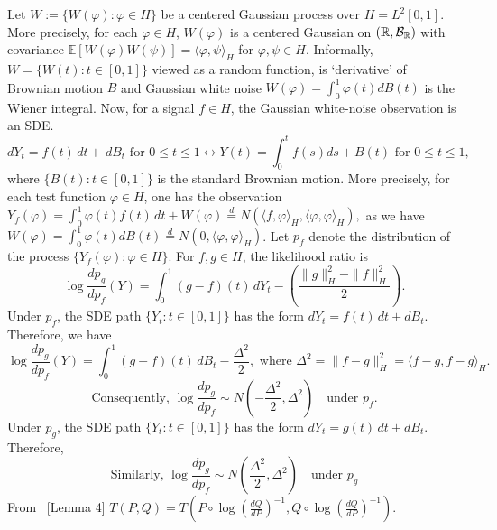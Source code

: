 Let \(W:= \{W(\varphi):\varphi \in H\} \) be a centered Gaussian process over \(H= L^2[0,1]\). More precisely,  for each \(\varphi\in H\), \(W(\varphi)\) is a centered Gaussian on $(\mathbb{R}, \mathcal{B}_{\mathbb{R}})$  with  covariance $\mathbb E[W(\varphi)W(\psi)] =
    \langle \varphi,\psi\rangle_{H}$ for $\varphi,\psi\in H.$ Informally, $W= \{W(t): t\in [0,1]\}$ viewed as a random function, is `derivative' of Brownian motion $B$ and Gaussian white noise $W(\varphi)=\int_{0}^1 \varphi(t)dB(t)$ \cite{gine2016mathematical} is the Wiener integral. Now, for a signal \(f\in H\), the Gaussian white-noise observation is an SDE.
\begin{equation} \label{eq:AGWN}
dY_t=f(t)\,dt+\,dB_t \text{ for } 0\le t\le 1 \leftrightarrow Y(t)= \int_{0}^t f(s)ds + B(t) \text{ for } 0\le t\le 1, 
\end{equation}
 where $\{B(t): t\in [0,1]\}$ is the standard Brownian motion.
More precisely, for each test function \(\varphi\in H\), one has the observation  $Y_f(\varphi) =\int_0^1 \varphi(t)f(t)\,dt + W(\varphi) \overset{d}{=} N(\langle f, \varphi \rangle_{H}, \langle \varphi, \varphi\rangle_H ),$ as we have $W(\varphi)= \int_{0}^1 \varphi(t) dB(t)\overset{d}{=} N(0, \langle \varphi, \varphi \rangle_H)$.
Let \(p_f\) denote the distribution of the process  $\{Y_f(\varphi):\varphi\in H\}.$
For \(f,g\in H\), the likelihood ratio is   
\begin{equation}
    \log\frac{dp_g}{dp_f}(Y)
    =
    \int_0^1 (g-f)(t)\,dY_t
    -
    \left(
        \frac{\|g\|_{H}^2-\|f\|_{H}^2}{2}
    \right).
\end{equation}
Under \(p_f\), the SDE path $\{Y_t:t \in [0,1]\}$ has the form  $dY_t=f(t)\,dt+ dB_t.$ Therefore, we have
\[
\log\frac{dp_g}{dp_f}(Y)
    =
    \int_0^1 (g-f)(t)\,dB_t
    -
    \frac{\Delta^2}{2}, \text{ where } \Delta^2= \|f-g\|_{H}^2 =\langle f-g, f-g\rangle_H .
\]
\begin{equation}
 \text{Consequently, }   \log\frac{dp_g}{dp_f}
    \sim
    N\left(- \frac{\Delta^2}{2},
        \Delta^2
    \right) \quad \text{under } p_f.
\end{equation}
Under \(p_g\), the SDE path $\{Y_t:t \in [0,1]\}$ has the form  $dY_t=g(t)\,dt+ dB_t.$ Therefore,
\begin{equation}
    \text{Similarly, }
    \log\frac{dp_g}{dp_f}
    \sim
    N\left( \frac{\Delta^2}{2},
        \Delta^2
    \right)
    \quad \text{under } p_g
\end{equation}
From ~\citet{pandey2025infinitely}[Lemma 4]  $T(P,Q)= T\left(P \circ \log \left(\frac{dQ}{dP}\right)^{-1}, Q \circ \log \left( \frac{dQ}{dP}\right)^{-1}\right)$.

